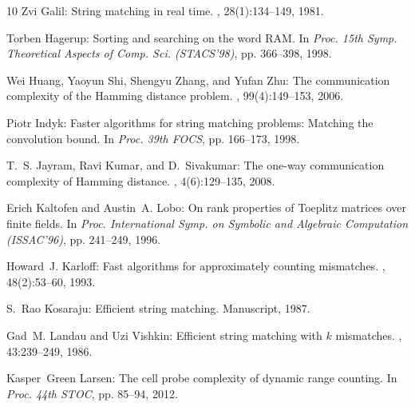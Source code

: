 \documentclass[11pt]{article}
\numberwithin{equation}{section}
\theoremstyle{definition}
\theoremstyle{plain}
\begin{document}
\begin{thebibliography}{10}
{\sc Zvi Galil}: String matching in real time.
, 28(1):134--149, 1981.
\newblock [\epfmtdoi{10.1145/322234.322244}]

{\sc Torben Hagerup}: Sorting and searching on the word {RAM}.
\newblock In {\em Proc. 15th Symp. Theoretical Aspects of Comp. Sci.
  (STACS'98)}, pp. 366--398, 1998.

{\sc Wei Huang, Yaoyun Shi, Shengyu Zhang, and Yufan Zhu}: The communication
  complexity of the {H}amming distance problem.
, 99(4):149--153, 2006.

{\sc Piotr Indyk}: Faster algorithms for string matching problems: Matching the
  convolution bound.
\newblock In {\em Proc. 39th FOCS}, pp. 166--173, 1998.

{\sc T.~S. Jayram, Ravi Kumar, and D.~Sivakumar}: The one-way communication
  complexity of {H}amming distance.
, 4(6):129--135, 2008.

{\sc Erich Kaltofen and Austin~A. Lobo}: On rank properties of {T}oeplitz
  matrices over finite fields.
\newblock In {\em Proc. International Symp. on Symbolic and Algebraic
  Computation (ISSAC'96)}, pp. 241--249, 1996.
\newblock [\epfmtdoi{10.1145/236869.237081}]

{\sc Howard~J. Karloff}: Fast algorithms for approximately counting mismatches.
, 48(2):53--60, 1993.
\newblock [\epfmtdoi{10.1016/0020-0190(93)90177-B}]

{\sc S.~Rao Kosaraju}: Efficient string matching.
\newblock Manuscript, 1987.

{\sc Gad~M. Landau and Uzi Vishkin}: Efficient string matching with {$k$}
  mismatches.
, 43:239--249, 1986.
\newblock [\epfmtdoi{10.1016/0304-3975(86)90178-7}]

{\sc Kasper~Green Larsen}: The cell probe complexity of dynamic range counting.
\newblock In {\em Proc. 44th STOC}, pp. 85--94, 2012.


\end{thebibliography}
\end{document}
